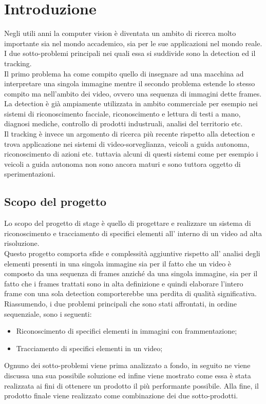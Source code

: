 \section{Introduzione}
Negli utili anni la computer vision è diventata un ambito di ricerca molto importante sia nel mondo accademico, sia per le sue applicazioni nel mondo reale. I due sotto-problemi principali nei quali essa si suddivide sono la detection ed il tracking.\\
Il primo problema ha come compito quello di insegnare ad una macchina ad interpretare una singola immagine  mentre il secondo problema estende lo stesso compito ma nell'ambito dei video, ovvero una sequenza di immagini dette frames. La detection è già ampiamente utilizzata in ambito commerciale per esempio nei sistemi di riconoscimento facciale, riconoscimento e lettura di testi a mano, diagnosi mediche, controllo di prodotti industruali, analisi del territorio etc.\\ 
Il tracking è invece un argomento di ricerca più recente rispetto alla detection e trova applicazione nei sistemi di video-sorveglianza, veicoli a guida autonoma, riconoscimento di azioni etc. tuttavia alcuni di questi sistemi come per esempio i veicoli a guida autonoma non sono ancora maturi e sono tuttora oggetto di sperimentazioni.
\subsection{Scopo del progetto}
Lo scopo del progetto di stage è quello di progettare e realizzare un sistema di riconoscimento e tracciamento di specifici elementi all' interno di un video ad alta risoluzione.\\
Questo progetto comporta sfide e complessità aggiuntive rispetto all' analisi degli elementi presenti in una singola immagine sia per il fatto che un video è composto da una sequenza di frames anziché da una singola immagine, sia per il fatto che i frames trattati sono in alta definizione e quindi elaborare l'intero frame con una sola detection comporterebbe una perdita di qualità significativa.\\
Riassumendo, i due problemi principali che sono stati affrontati, in ordine sequenziale, sono i seguenti:
\begin{itemize}
\item Riconoscimento di specifici elementi in immagini con frammentazione;
\item Tracciamento di specifici elementi in un video;
\end{itemize}
Ognuno dei sotto-problemi viene prima analizzato a fondo, in seguito ne viene discussa una sua possibile soluzione ed infine viene mostrato come essa è stata realizzata ai fini di ottenere un prodotto il più performante possibile.
Alla fine, il prodotto finale viene realizzato come combinazione dei due sotto-prodotti.

